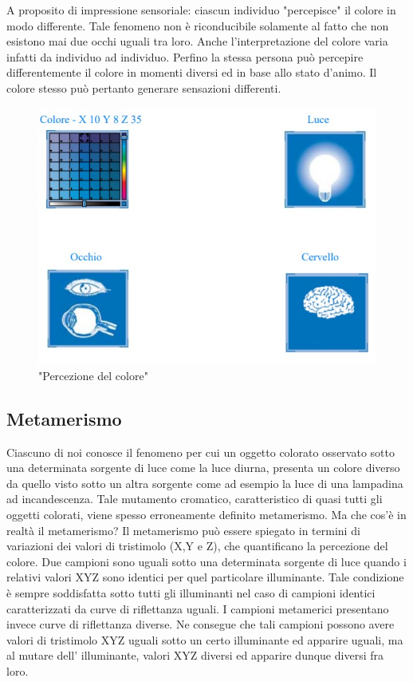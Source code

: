 \documentclass[a4paper,11pt]{article}
\begin{document}
        A proposito di impressione sensoriale: ciascun individuo "percepisce" il colore in modo
        differente. Tale fenomeno non è riconducibile solamente al fatto che non esistono mai due occhi
        uguali tra loro. Anche l’interpretazione del colore varia infatti da individuo ad individuo.
        Perfino la stessa persona può percepire differentemente il colore in momenti diversi ed in base
        allo stato d’animo. Il colore stesso può pertanto generare sensazioni differenti. 

        \begin{figure}[h]
            \centering
            \includegraphics[scale=0.8]{colorimetria1}
            \caption{"Percezione del colore"}
        \end{figure}
        \newpage
        \subsection{Metamerismo}
        Ciascuno di noi conosce il fenomeno per cui un oggetto colorato osservato sotto una
        determinata sorgente di luce come la luce diurna, presenta un colore diverso da quello visto
        sotto un altra sorgente come ad esempio la luce di una lampadina ad incandescenza. Tale
        mutamento cromatico, caratteristico di quasi tutti gli oggetti colorati, viene spesso erroneamente
        definito metamerismo. Ma che cos’è in realtà il metamerismo?
        Il metamerismo può essere spiegato in termini di variazioni dei valori di tristimolo (X,Y e Z),
        che quantificano la percezione del colore. Due campioni sono uguali sotto una determinata
        sorgente di luce quando i relativi valori XYZ sono identici per quel particolare illuminante. Tale
        condizione è sempre soddisfatta sotto tutti gli illuminanti nel caso di campioni identici
        caratterizzati da curve di riflettanza uguali. I campioni metamerici presentano invece curve di
        riflettanza diverse. Ne consegue che tali campioni possono avere valori di tristimolo XYZ
        uguali sotto un certo illuminante ed apparire uguali, ma al mutare dell' illuminante, valori XYZ
        diversi ed apparire dunque diversi fra loro. 
        
\end{document}
